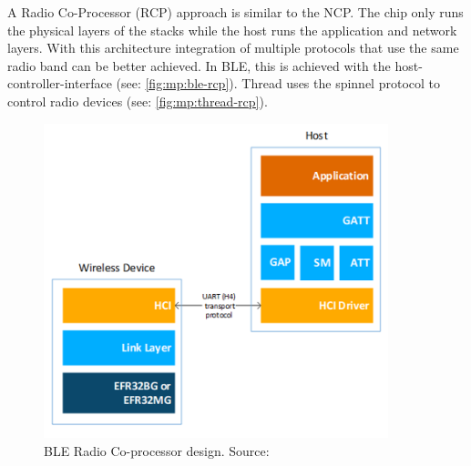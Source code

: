 A Radio Co-Processor (RCP) approach is similar to the NCP. The chip only runs the physical layers of the stacks while the host runs the application and network layers. With this architecture integration of multiple protocols that use the same radio band can be better achieved. In BLE, this is achieved with the host-controller-interface (see: \autoref{fig:mp:ble-rcp}). Thread uses the spinnel protocol to control radio devices (see: \autoref{fig:mp:thread-rcp}).

\begin{figure}
    \centering
    \includegraphics[width=100mm, keepaspectratio]{figures/silabs-ble-rcp-QSG169.png}
    \caption{BLE Radio Co-processor design. Source: \cite{silabs:qsg169}}
    \label{fig:mp:ble-rcp}
\end{figure}
